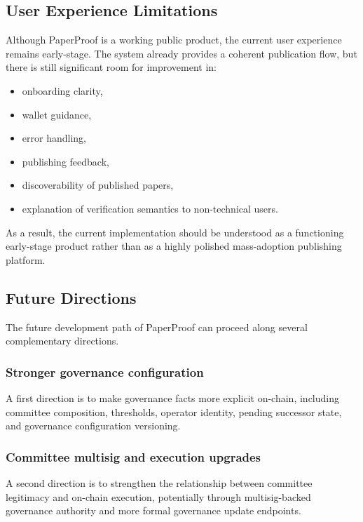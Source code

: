 \documentclass[journal]{IEEEtran}
\begin{document}
\subsection{User Experience Limitations}

Although PaperProof is a working public product, the current user experience remains early-stage. The system already provides a coherent publication flow, but there is still significant room for improvement in:

\begin{itemize}
\item onboarding clarity,
\item wallet guidance,
\item error handling,
\item publishing feedback,
\item discoverability of published papers,
\item explanation of verification semantics to non-technical users.
\end{itemize}


As a result, the current implementation should be understood as a functioning early-stage product rather than as a highly polished mass-adoption publishing platform.

\subsection{Future Directions}

The future development path of PaperProof can proceed along several complementary directions.

\subsubsection{Stronger governance configuration}

A first direction is to make governance facts more explicit on-chain, including committee composition, thresholds, operator identity, pending successor state, and governance configuration versioning.

\subsubsection{Committee multisig and execution upgrades}

A second direction is to strengthen the relationship between committee legitimacy and on-chain execution, potentially through multisig-backed governance authority and more formal governance update endpoints.
\end{document}
